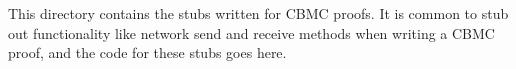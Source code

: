 This directory contains the stubs written for CBMC proofs. It is common to stub out functionality like network send and receive methods when writing a CBMC proof, and the code for these stubs goes here. 